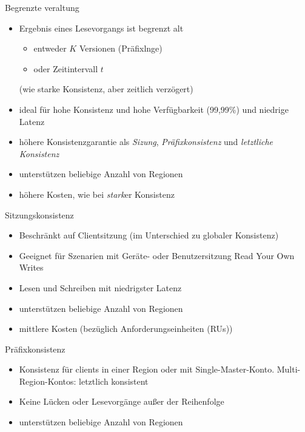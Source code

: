 \begin{flashcard}[Definition]{Begrenzte veraltung}
    \begin{itemize}
        \item Ergebnis eines Lesevorgangs ist begrenzt alt
            \begin{itemize}
                \item entweder $K$ Versionen (Präfixlnge)
                \item oder Zeitintervall $t$
            \end{itemize}
            (wie starke Konsistenz, aber zeitlich verzögert)
        \item ideal für hohe Konsistenz und hohe Verfügbarkeit (99,99\%) und niedrige Latenz
        \item höhere Konsistenzgarantie als \emph{Sizung}, \emph{Präfixkonsistenz} und \emph{letztliche Konsistenz}
        \item unterstützen beliebige Anzahl von Regionen
        \item höhere Kosten, wie bei \emph{stark}er Konsistenz
    \end{itemize}
\end{flashcard}

\begin{flashcard}[Definition]{Sitzungskonsistenz}
    \begin{itemize}
        \item Beschränkt auf Clientsitzung (im Unterschied zu globaler Konsistenz)
        \item Geeignet für Szenarien mit Geräte- oder Benutzersitzung\newline
            Read Your Own Writes
        \item Lesen und Schreiben mit niedrigster Latenz
        \item unterstützen beliebige Anzahl von Regionen
        \item mittlere Kosten (bezüglich Anforderungseinheiten (RUs))
    \end{itemize}
\end{flashcard}

\begin{flashcard}[Definition]{Präfixkonsistenz}
    \begin{itemize}
        \item Konsistenz für clients in einer Region oder mit Single-Master-Konto. Multi-Region-Kontos: letztlich konsistent
        \item Keine Lücken oder Lesevorgänge außer der Reihenfolge
        \item unterstützen beliebige Anzahl von Regionen
    \end{itemize}
\end{flashcard}

